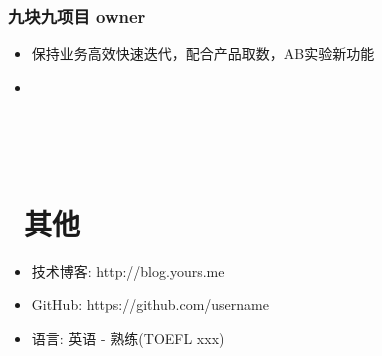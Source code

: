 \documentclass{resume}
\begin{document}
\subsubsection*{九块九项目 owner}
\begin{onehalfspacing}
  \begin{itemize}
    \item 保持业务高效快速迭代，配合产品取数，AB实验新功能
    \item
  \end{itemize}
\end{onehalfspacing}


\


\

\section{\faInfo\ 其他}
\begin{itemize}[parsep=0.5ex]
  \item 技术博客: http://blog.yours.me
  \item GitHub: https://github.com/username
  \item 语言: 英语 - 熟练(TOEFL xxx)
\end{itemize}

%
%
\end{document}
